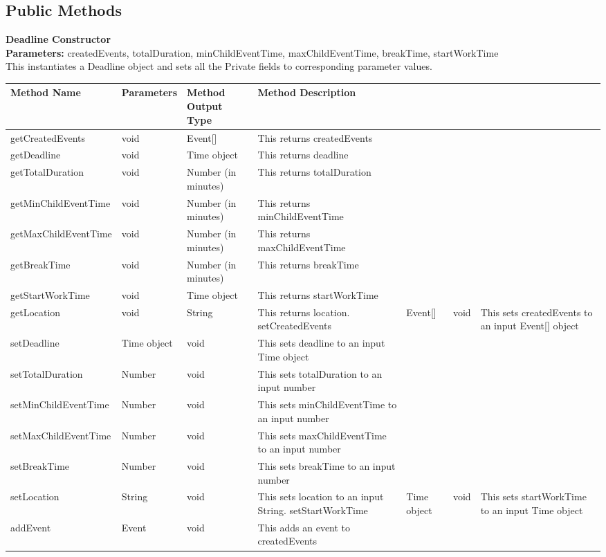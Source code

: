 \documentclass{scrreprt}
\begin{document}
\subsection{Public Methods}

\textbf{Deadline Constructor} \\
\textbf{Parameters:} createdEvents, totalDuration, minChildEventTime, maxChildEventTime, breakTime, startWorkTime \\
This instantiates a Deadline object and sets all the Private fields to corresponding parameter values.

\begin{center}
\begin{longtable}{ | p{4cm} | p{3cm} | p{2cm} | p{5cm} | }
\hline
\textbf{Method Name} & \textbf{Parameters} & \textbf{Method Output Type} & \textbf{Method Description} \\
\hline
getCreatedEvents & void & Event[] & This returns createdEvents \\
\hline
getDeadline & void & Time object & This returns deadline \\
\hline
getTotalDuration & void & Number (in minutes) & This returns totalDuration \\
\hline
getMinChildEventTime & void & Number (in minutes) & This returns minChildEventTime \\
\hline
getMaxChildEventTime & void & Number (in minutes) & This returns maxChildEventTime \\
\hline
getBreakTime & void & Number (in minutes) & This returns breakTime \\
\hline
getStartWorkTime & void & Time object & This returns startWorkTime \\
\hline
getLocation & void & String & This returns location.
\hline
setCreatedEvents & Event[] & void & This sets createdEvents to an input Event[] object \\
\hline
setDeadline & Time object & void & This sets deadline to an input Time object \\
\hline
setTotalDuration & Number & void & This sets totalDuration to an input number \\
\hline
setMinChildEventTime & Number & void & This sets minChildEventTime to an input number \\
\hline
setMaxChildEventTime & Number & void & This sets maxChildEventTime to an input number \\
\hline
setBreakTime & Number & void & This sets breakTime to an input number \\
\hline
setLocation & String & void & This sets location to an input String.
\hline
setStartWorkTime & Time object & void & This sets startWorkTime to an input Time object \\
\hline
addEvent & Event & void & This adds an event to createdEvents \\
\hline
\end{longtable}
\end{center}
\end{document}
